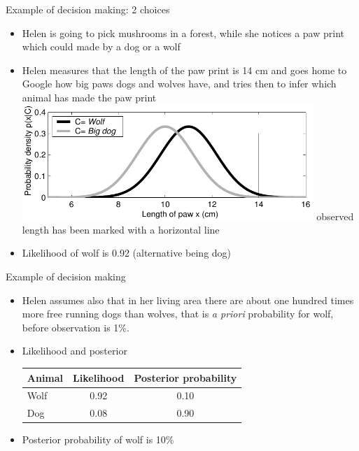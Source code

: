 \documentclass[t]{beamer}
\begin{document}
\begin{frame}

{\Large\color{navyblue} Example of decision making: 2 choices}

\begin{itemize}
\item<+-> Helen is going to pick mushrooms in a forest, while she notices a
  paw print which could made by a dog or a wolf
\item<+-> Helen measures that the length of the paw print is 14 cm and
  goes home to Google how big paws dogs and wolves have, and tries
  then to infer which animal has made the paw print
  \includegraphics[width=11cm]{hatutus_likelihoods}
  observed length has been marked with a horizontal line
\item<+-> Likelihood of wolf is 0.92 (alternative being dog)
\end{itemize}

\end{frame}

\begin{frame}
  
{\Large\color{navyblue} Example of decision making}

  \begin{itemize}
  \item<+-> Helen assumes also that in her living area there are about one
    hundred times more free running dogs than wolves, that is {\em a
      priori} probability for wolf, before observation is 1\%.
  \item<+-> Likelihood and posterior
    \begin{center}\leavevmode
      \begin{tabular}{| l | c c |}
        \hline
        Animal &  Likelihood & Posterior probability \\
        \hline
        Wolf     &  0.92            & 0.10      \\
        Dog    &  0.08        & 0.90    \\
        \hline
      \end{tabular}
    \end{center}
  \item<+-> Posterior probability of wolf is 10\%
  \end{itemize}

\end{frame}
\end{document}
